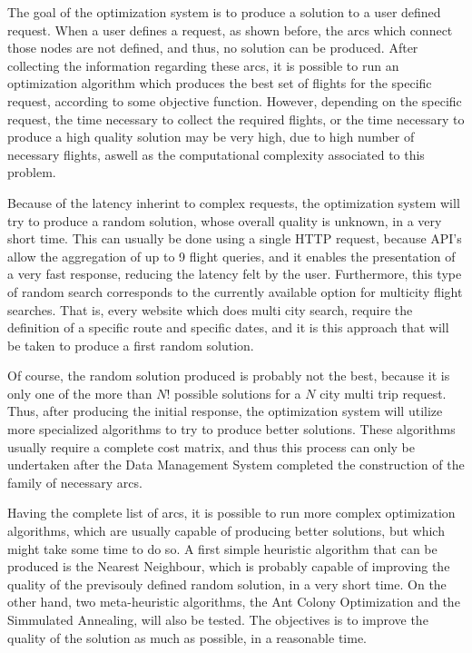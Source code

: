 

The goal of the optimization system is to produce a solution to a user defined request.
When a user defines a request, as shown before, the arcs which connect those nodes are not defined, 
and thus, no solution can be produced.
After collecting the information regarding these arcs, it is possible to run 
an optimization algorithm which produces the best set of flights for the specific request,
according to some objective function.
However, depending on the specific request, the time necessary to collect 
the required flights, or the time necessary to produce a high quality solution may be very high,
due to high number of necessary flights, aswell as the computational complexity associated to this problem.

Because of the latency inherint to complex requests,
the optimization system will try to produce a random solution, whose overall quality is unknown,
in a very short time. This can usually be done using a single HTTP request,
because API's allow the aggregation of up to 9 flight queries,
and it enables the presentation of a very fast response,
reducing the latency felt by the user.
Furthermore, this type of random search corresponds to the currently available option 
for multicity flight searches. That is, every website which does multi city search, 
require the definition of a specific route and specific dates,
and it is this approach that will be taken to produce a first random solution.

Of course, the random solution produced is probably not the best,
because it is only one of the more than $N!$ possible solutions for a $N$ city multi trip request.
Thus, after producing the initial response, the optimization system  
will utilize more specialized algorithms to try to produce better solutions.
These algorithms usually require a complete cost matrix, 
and thus this process can only be undertaken after the Data Management System completed the construction 
of the family of necessary arcs.

Having the complete list of arcs, it is possible to run more complex optimization algorithms,
which are usually capable of producing better solutions, but which might take some time to do so.
A first simple heuristic algorithm that can be produced is the Nearest Neighbour,
which is probably capable of improving the quality of the previsouly defined random solution,
in a very short time.
On the other hand, two meta-heuristic algorithms, the Ant Colony Optimization and the Simmulated Annealing, 
will also be tested.
The objectives is to improve the quality of the solution as much as possible,
in a reasonable time. 

